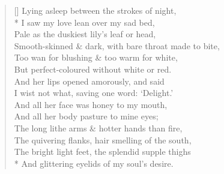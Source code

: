 \documentclass[MAIN]{subfiles}
\begin{document}
\settowidth{\versewidth}{Smooth-skinned \& dark, with bare throat made to bite,}
\begin{verse}[\versewidth]
Lying asleep between the strokes of night,\\*
\vin I saw my love lean over my sad bed,\\
\vin Pale as the duskiest lily's leaf or head,\\
Smooth-skinned \& dark, with bare throat made to bite,\\
Too wan for blushing \& too warm for white,\\
\vin But perfect-coloured without white or red.\\
\vin And her lips opened amorously, and said\\
I wist not what, saving one word: `Delight.'\\
And all her face was honey to my mouth,\\
\vin And all her body pasture to mine eyes;\\
\vin \vin The long lithe arms \& hotter hands than fire,\\
The quivering flanks, hair smelling of the south,\\
\vin The bright light feet, the splendid supple thighs\\*
\vin \vin And glittering eyelids of my soul's desire.
\end{verse}
\end{document}

